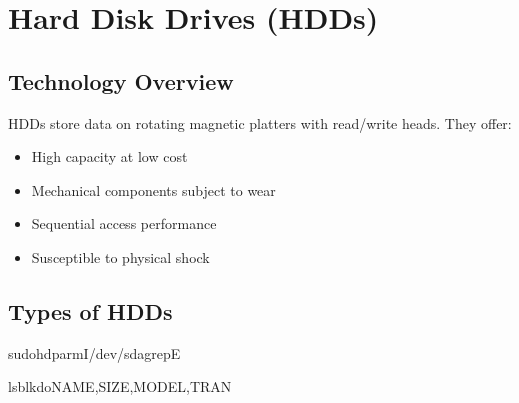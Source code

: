 \documentclass[letterpaper,10pt,english]{sphinxmanual}
\begin{document}
\section{Hard Disk Drives (HDDs)}
\label{\detokenize{storage-devices:hard-disk-drives-hdds}}

\subsection{Technology Overview}
\label{\detokenize{storage-devices:technology-overview}}
\sphinxAtStartPar
HDDs store data on rotating magnetic platters with read/write heads. They offer:
\begin{itemize}
\item {} 
\sphinxAtStartPar
High capacity at low cost

\item {} 
\sphinxAtStartPar
Mechanical components subject to wear

\item {} 
\sphinxAtStartPar
Sequential access performance

\item {} 
\sphinxAtStartPar
Susceptible to physical shock

\end{itemize}


\subsection{Types of HDDs}
\label{\detokenize{storage-devices:types-of-hdds}}
\sphinxAtStartPar
{}

\begin{sphinxVerbatim}[commandchars=\\\{\}]
sudohdparm\PYGZhy{}I/dev/sdagrep\PYGZhy{}E

\end{sphinxVerbatim}

\sphinxAtStartPar
{}

\begin{sphinxVerbatim}[commandchars=\\\{\}]
lsblk\PYGZhy{}d\PYGZhy{}oNAME,SIZE,MODEL,TRAN

\end{sphinxVerbatim}
\end{document}
